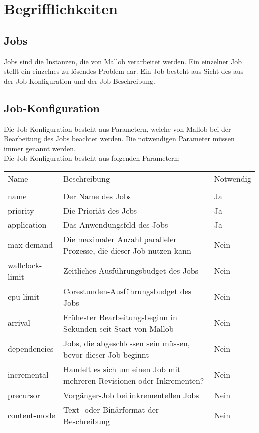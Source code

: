 \section{Begrifflichkeiten}

\subsection{Jobs}
\label{B:Jobs}

Jobs sind die Instanzen, die von Mallob verarbeitet werden. Ein einzelner Job stellt ein einzelnes zu lösendes Problem dar. Ein Job besteht aus Sicht des  aus der Job-Konfiguration und der Job-Beschreibung.

\subsection{Job-Konfiguration}
\label{B:Job-Konfiguration}
Die Job-Konfiguration besteht aus Parametern, welche von Mallob bei der Bearbeitung des Jobs beachtet werden. Die notwendigen Parameter müssen immer genannt werden.\\
Die Job-Konfiguration besteht aus folgenden Parametern: \\

\begin{tabular}{lL{0.6\textwidth}l}
        Name & Beschreibung & Notwendig\\
        \\
        name & Der Name des Jobs & Ja\\
        priority & Die Prioriät des Jobs & Ja\\
        application & Das Anwendungsfeld des Jobs & Ja\\ 
        max-demand & Die maximaler Anzahl paralleler Prozesse, die dieser Job nutzen kann & Nein\\
        wallclock-limit & Zeitliches Ausführungsbudget des Jobs & Nein\\
        cpu-limit & Corestunden-Ausführungsbudget des Jobs & Nein\\
        arrival & Frühester Bearbeitungsbeginn in Sekunden seit Start von Mallob & Nein\\
        dependencies & Jobs, die abgeschlossen sein müssen, bevor dieser Job beginnt & Nein\\
        incremental & Handelt es sich um einen Job mit mehreren Revisionen oder Inkrementen? &  Nein\\
        precursor & Vorgänger-Job bei inkrementellen Jobs & Nein\\
        content-mode & Text- oder Binärformat der Beschreibung & Nein\\
    \end{tabular} 
    
